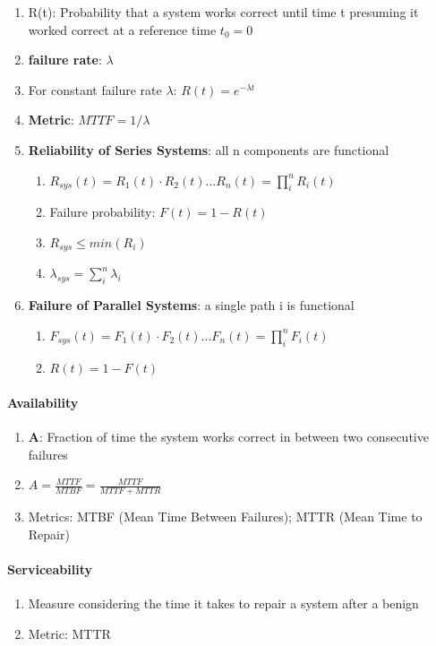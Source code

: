 \documentclass[english]{latex4ei/latex4ei_sheet}
\begin{document}
\begin{enumerate}
	\item R(t): Probability that a system works correct until time t presuming it worked correct at a reference time $t_0 = 0$
	\item \textbf{failure rate}: $\lambda$
	\item For constant failure rate $\lambda$: $R(t)= e^{-\lambda t} $
	\item \textbf{Metric}: $MTTF = 1 / \lambda$
	\item \textbf{Reliability of Series Systems}: all n components are functional
	\begin{enumerate}
	\item $R_{sys}(t) = R_1(t) \cdot R_2(t)...R_n(t) = \prod_i^n R_i(t)$
	\item Failure probability: $F(t) = 1 - R(t)$
	\item $R_{sys} \leq min(R_i)$
	\item $\lambda_{sys} = \sum_i^n \lambda_i$ 
	\end{enumerate}
        \item \textbf{Failure of Parallel Systems}: a single path i is functional
	\begin{enumerate}
	  \item $F_{sys}(t) = F_1(t) \cdot F_2(t)...F_n(t) = \prod_i^n F_i(t)$
	  \item $R(t) = 1 - F(t)$
	\end{enumerate}

\end{enumerate}

\paragraph{Availability}
\begin{enumerate}
	\item \textbf{A}: Fraction of time the system works correct in between two consecutive failures
	\item $A = \frac{MTTF}{MTBF} = \frac{MTTF}{MTTF + MTTR}$
	\item Metrics: MTBF (Mean Time Between Failures); MTTR (Mean Time to Repair)
\end{enumerate}

\paragraph{Serviceability}
\begin{enumerate}
	\item Measure considering the time it takes to repair a system after a benign
	\item Metric: MTTR 
\end{enumerate}
\end{document}
